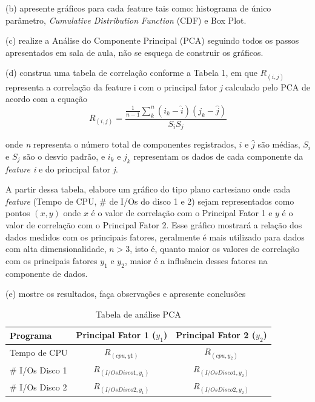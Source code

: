 \documentclass[11pt,a4paper,openany,oneside]{abntex2}
\begin{document}
	(b) apresente gráficos para cada feature tais como: histograma de único parâmetro, \textit{Cumulative Distribution Function} (CDF) e Box Plot.
	
	(c) realize a Análise do Componente Principal (PCA) seguindo todos os passos apresentados em sala de aula, não se esqueça de construir os gráficos.
	
	(d) construa uma tabela de correlação conforme a Tabela 1, em que $R_{(i,j)}$ representa a correlação da feature i com o principal fator \textit{j} calculado pelo PCA de acordo com a equação
	\begin{equation}
	R_{(i,j)} = \frac{\frac{1}{n-1} \sum_{k}^{n}(i_k-\hat{i})(j_k-\hat{j})}{S_i  S_j}
	\end{equation}
	
	
	
	
	onde \textit{n} representa o número total de componentes registrados, $\hat{i}$ e $\hat{j}$ são médias, $S_i$ e
	$S_j$ são o desvio padrão, e $i_k$ e $j_k$ representam os dados de cada componente da \textit{feature i} e do principal fator \textit{j}.
	
	A partir dessa tabela, elabore um gráfico do tipo plano cartesiano onde cada \textit{feature} (Tempo de CPU, \# de I/Os do disco 1 e 2) sejam representados como pontos $(x, y)$ onde $x$ é o valor de correlação com o Principal Fator 1 e $y$ é o valor de correlação com o Principal Fator 2. Esse gráfico mostrará a relação dos dados medidos com os principais fatores, geralmente é mais utilizado para dados com alta dimensionalidade, $n > 3$, isto é, quanto maior os valores de correlação com os principais fatores $y_1$ e $y_2$, maior é a influência desses fatores na componente de dados.
	
	(e) mostre os resultados, faça observações e apresente conclusões
	
	\begin{table}[htbp]
		\centering
		\caption{Tabela de análise PCA} 
		
		\begin{tabular}{lcc}
			\toprule
		 Programa    & Principal Fator 1 ($y_1$) &Principal Fator 2 ($y_2$)\\
			\midrule
		Tempo de CPU     & $R_{(cpu,y1)}$        & $R_{(cpu,y_2)}$   \\
		\# I/Os Disco 1  & $R_{(I/OsDisco1,y_1)}$ & $R_{(I/OsDisco1,y_2)}$    \\
		\# I/Os Disco 2  & $R_{(I/OsDisco2,y_1)}$ & $R_{(I/OsDisco2,y_2)}$       \\
			\bottomrule
		\end{tabular}%
		\label{tab:apca}%
	\end{table}%
\end{document}
